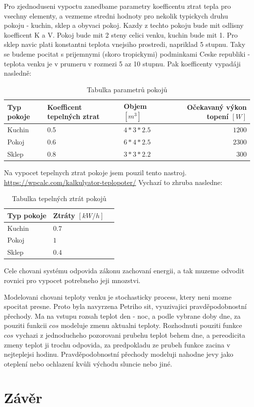 Pro zjednoduseni vypoctu zanedbame parametry koefficentu ztrat tepla pro vsechny elementy, a vezmeme stredni hodnoty pro nekolik typickych druhu pokoju - kuchin, sklep a obyvaci pokoj. Kazdy z techto pokoju bude mit odlisny koefficent K a V. Pokoj bude mit 2 steny celici venku, kuchin bude mit 1. Pro sklep navic plati konstantni teplota vnejsiho prostredi, napriklad 5 stupnu. Taky se budeme pocitat s prijemnymi (skoro tropickymi) podminkami Ceske republiki - teplota venku je v prumeru v rozmezi 5 az 10 stupnu. \cite{cesko}
Pak koefficenty vypadáji nasledně:

\begin{table}[H]
	\vskip6pt
	\caption{Tabulka parametrů pokojů}
    \vskip6pt
	\centering
	\begin{tabular}{lllr}
		\toprule
		Typ pokoje & Koefficent tepelných ztrat & Objem $[m^3]$ & Očekavaný výkon topení $[W]$ \\
    \midrule
    Kuchin & 0.5 & $4*3*2.5$ & $1200$ \\
    Pokoj & 0.6 & $6*4*2.5$ & $2300$ \\
    Sklep & 0.8 & $3*3*2.2$ & $300$ \\
		\bottomrule
	\end{tabular}
	\label{tab:Parametry}
\end{table}

Na vypocet tepelnych ztrat pokoje jsem pouzil tento nastroj. \url{https://wpcalc.com/kalkulyator-teplopoter/}
Vychazí to zhruba nasledne:

\begin{table}[H]
	\vskip6pt
	\caption{Tabulka tepelných ztrát pokojů}
    \vskip6pt
	\centering
	\begin{tabular}{llr}
		\toprule
		Typ pokoje & Ztráty $[kW/h]$ \\
		\midrule
		Kuchin & $0.7$ \\
    Pokoj & $1$ \\
    Sklep & $0.4$ \\
		\bottomrule
	\end{tabular}
	\label{tab:TepelneZtraty}
\end{table}

Cele chovani systému odpovida zákonu zachovaní energii, a tak muzeme odvodit rovnici pro vypocet potrebneho jeji mnozstvi.


Modelovani chovani teploty venku je stochasticky process, ktery neni mozne spocitat presne. Proto byla navyrzena Petriho sit, vyuzivajici pravděpodobnostní přechody. Ma na vstupu rozsah teplot den - noc, a podle vybrane doby dne, za pouziti funkcii $cos$ modeluje zmenu aktualni teploty. Rozhodnuti pouziti funkce $cos$ vychazi z jednoducheho pozorovani prubehu teplot behem dne, a pereodicita zmeny teplot ji trochu odpovida, za predpokladu ze prubeh funkce zacina v nejteplejsi hodinu. %
Pravděpodobnostní přechody modeluji nahodne jevy jako oteplení nebo ochlazení kvůli východu sluncie nebo jiné.


\chapter{Závěr}
\label{zaver}
